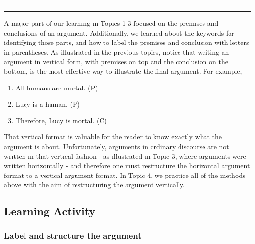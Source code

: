 \documentclass[
]{book}
\providecommand{\tightlist}{%
  \setlength{\itemsep}{0pt}\setlength{\parskip}{0pt}}
\begin{document}
\begin{center}\rule{0.5\linewidth}{0.5pt}\end{center}

\begin{center}\rule{0.5\linewidth}{0.5pt}\end{center}

A major part of our learning in Topics 1-3 focused on the premises and conclusions of an argument. Additionally, we learned about the keywords for identifying those parts, and how to label the premises and conclusion with letters in parentheses. As illustrated in the previous topics, notice that writing an argument in vertical form, with premises on top and the conclusion on the bottom, is the most effective way to illustrate the final argument. For example,

\begin{enumerate}
\def\labelenumi{\arabic{enumi}.}
\tightlist
\item
  All humans are mortal. (P)\\
\item
  Lucy is a human. (P)\\
\item
  Therefore, Lucy is mortal. (C)
\end{enumerate}

That vertical format is valuable for the reader to know exactly what the argument is about. Unfortunately, arguments in ordinary discourse are not written in that vertical fashion - as illustrated in Topic 3, where arguments were written horizontally - and therefore one must restructure the horizontal argument format to a vertical argument format. In Topic 4, we practice all of the methods above with the aim of restructuring the argument vertically.

\hypertarget{learning-activity-2}{%
\subsection*{Learning Activity}\label{learning-activity-2}}

\hypertarget{label-and-structure-the-argument}{%
\subsubsection*{Label and structure the argument}\label{label-and-structure-the-argument}}
\end{document}
